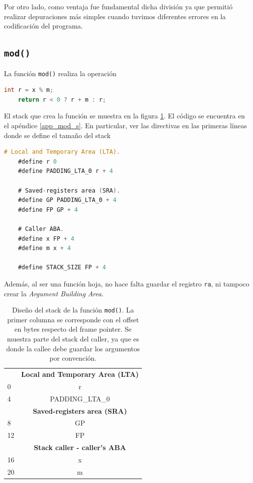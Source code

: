 \documentclass[a4paper,12pt]{article}
\numberwithin{equation}{section}
\numberwithin{figure}{section}
\begin{document}
	Por otro lado, como ventaja fue fundamental dicha división ya que permitió realizar depuraciones más simples cuando tuvimos diferentes errores en la codificación del programa.
	
	\subsection{\texttt{mod()}}
	
	La función \texttt{mod()} realiza la operación
	\begin{lstlisting}[language=C, style=StyleC]
	int r = x % m;
	return r < 0 ? r + m : r;
	\end{lstlisting}
	
	El stack que crea la función se muestra en la figura \ref{stack_mod}. El código se encuentra en el apéndice \ref{app_mod_s}. En particular, ver las directivas en las primeras líneas donde se define el tamaño del stack
	\begin{lstlisting}[language=C, style=StyleC]
	# Local and Temporary Area (LTA).
	#define r 0
	#define PADDING_LTA_0 r + 4
	
	# Saved-registers area (SRA).
	#define GP PADDING_LTA_0 + 4
	#define FP GP + 4
	
	# Caller ABA.
	#define x FP + 4
	#define m x + 4
	
	#define STACK_SIZE FP + 4
	\end{lstlisting}
	
	Además, al ser una función hoja, no hace falta guardar el registro \texttt{ra}, ni tampoco crear la \textit{Argument Building Area}.
	
	\begin{table}[H]
		\centering
		\begin{tabular}{@{}l|c|@{}}
			\cmidrule(l){2-2} 
			\multicolumn{1}{c|}{\textbf{}} & \textbf{Local and Temporary Area (LTA)} \\ \cmidrule(l){2-2} 
			0 & r \\ \cmidrule(l){2-2} 
			4 & PADDING\_LTA\_0 \\ \cmidrule(l){2-2} 
			\multicolumn{1}{c|}{\textbf{}} & \textbf{Saved-registers area (SRA)} \\ \cmidrule(l){2-2} 
			8 & GP \\ \cmidrule(l){2-2} 
			12 & FP \\ \cmidrule(l){2-2} 
			\multicolumn{1}{c|}{\textbf{}} & \textbf{Stack caller - caller's ABA} \\ \cmidrule(l){2-2} 
			16 & x \\ \cmidrule(l){2-2} 
			20 & m \\ \cmidrule(l){2-2} 
		\end{tabular}
		\caption{Diseño del stack de la función \texttt{mod()}. La primer columna se corresponde con el offset en bytes respecto del frame pointer. Se muestra parte del stack del caller, ya que es donde la callee debe guardar los argumentos por convención.}
		\label{stack_mod}
	\end{table}
	
\end{document}
